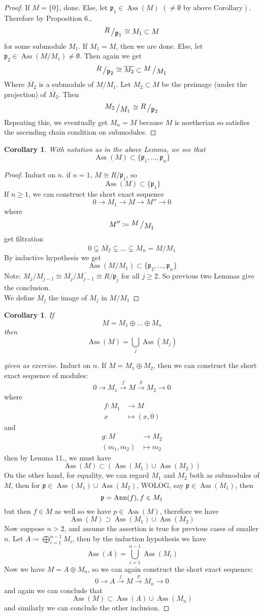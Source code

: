 \documentclass[12pt]{article}
\newcommand{\ann}[1]{\textup{Ann}(#1)}
\DeclareMathOperator{\Ass}{Ass}
\newcommand{\bigslant}[2]{{\raisebox{.2em}{$#1$}\left/\raisebox{-.2em}{$#2$}\right.}}
\newcommand{\mapping}[5]{\begin{align*}
#1\colon #2 &\to #3\\
#4 & \mapsto #5
\end{align*}}
\def\p{\mathfrak{p}}
\newtheorem{corollary}[theorem]{Corollary}
\theoremstyle{definition}
\begin{document}
\begin{proof}
If $M = \{0\}$, done. Else, let $\p_1 \in \Ass(M)$ $(\neq \emptyset \text{ by above Corollary})$. Therefore by Proposition 6., 
\[
\bigslant{R}{\p_1} \cong M_1 \subset M
\]
for some submodule $M_1$. If $M_1 = M$, then we are done. Else, let $\p_2 \in \Ass(M/M_1) \neq \emptyset$. Then again we get
\[
\bigslant{R}{\p_2} \cong \overline{M_2} \subset \bigslant{M}{M_1}
\]
Where $\overline{M_2}$ is a submodule of $M/M_1$. Let $M_2 \subset M$ be the preimage (under the projection) of $\overline{M_2}$. Then 
\[
\bigslant{M_2}{M_1} \cong \bigslant{R}{\p_2}
\]
Repeating this, we eventually get $M_n = M$ because $M$ is noetherian so satisfies the ascending chain condition on submodules. 
\end{proof}
\begin{corollary}
With notation as in the above Lemma, we see that
\[
\Ass(M) \subset \{\p_1,\dots ,\p_n\}
\]
\end{corollary}
\begin{proof}
Induct on $n$. if $n=1$, $M\cong R/\p_1$, so 
\[
\Ass(M) \subset \{\p_1\}
\]
If $n \geq 1$, we can construct the short exact sequence
\[
0 \rightarrow M_1 \rightarrow M \rightarrow M'' \rightarrow 0
\]
where
\[
M'' \coloneqq \bigslant{M}{M_1}
\]
get filtration
\[
0 \subsetneq \overline{M_2} \subsetneq \dots \subsetneq \overline{M_n} = M/M_1
\]
By inductive hypothesis we get
\[
\Ass(M/M_1) \subset \{\p_2,\dots ,\p_n\}
\]
Note: $M_j/M_{j-1} \cong \overline{M_j} / \overline{M_{j-1}}\cong R/\p_j$ for all $j\geq 2$. So previous two Lemmas give the conclusion.\\
We define $\overline{M_j}$ the image of $M_j$ in $M/M_1$
\end{proof}
\begin{corollary}
If 
\[
M = M_1 \oplus \dots \oplus M_n
\]
then 
\[
\Ass(M) = \bigcup_j \Ass(M_j)
\]
\end{corollary}
\begin{proof}[given as exercise]
Induct on $n$. If $M = M_1 \oplus M_2$, then we can construct the short exact sequence of modules:
\[
0 \rightarrow M_1 \xrightarrow{f} M \xrightarrow{g} M_2 \rightarrow 0
\]
where
\[
\mapping{f}{M_1}{M}{x}{(x,0)}
\]
and
\[
\mapping{g}{M}{M_2}{(m_1,m_2)}{m_2}
\]
then by Lemma 11., we must have
\[
\Ass(M) \subset (\Ass(M_1) \cup \Ass(M_2))
\]
On the other hand, for equality, we can regard $M_1$ and $M_2$ both as submodules of $M$, then for $\p \in \Ass(M_1)\cup \Ass(M_2)$, WOLOG, say $\p \in \Ass(M_1)$, then 
\[
\p = \ann{f}, f\in M_1
\]
but then $f\in M$ as well so we have $p\in \Ass(M)$, therefore we have
\[
\Ass(M) \supset \Ass(M_1) \cup \Ass(M_2)
\]
Now suppose $n > 2$, and assume the assertion is true for previous cases of smaller $n$. Let $A\coloneqq \bigoplus_{i=1}^{n-1} M_i$, then by the induction hypothesis we have
\[
\Ass(A) = \bigcup_{i=1}^{n-1}\Ass(M_i)
\]
Now we have $M = A \oplus M_n$, so we can again construct the short exact sequence:
\[
0 \rightarrow A \xrightarrow{f} M \xrightarrow{g} M_n \rightarrow 0
\]
and again we can conclude that
\[
\Ass(M) \subset \Ass(A) \cup \Ass(M_n)
\]
and similarly we can conclude the other inclusion.
\end{proof}
\end{document}
